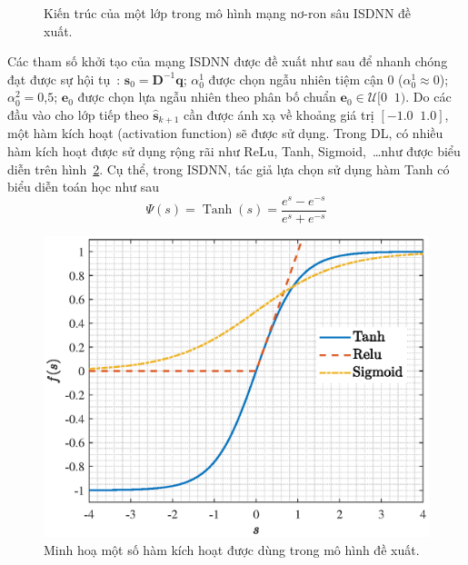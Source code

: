 \begin{figure}[ht]
    \caption{Kiến trúc của một lớp trong mô hình mạng nơ-ron sâu ISDNN đề xuất.}
    \label{fig:ISD}
\end{figure}

Các tham số khởi tạo của mạng ISDNN được đề xuất như sau để nhanh chóng đạt được sự hội tụ~\cite{Narasimhan2014}: $\mathbf{s}_0 = \mathbf{D}^{-1}\mathbf{q}$; $\alpha^1_0$ được chọn ngẫu nhiên tiệm cận $0$ ($\alpha^1_0 \approx 0$); $\alpha^2_0 = 0$,$5$; $\mathbf{e}_0$ được chọn lựa ngẫu nhiên theo phân bố chuẩn $\mathbf{e}_0 \in  \mathcal{U}[0 \;\; 1)$. Do các đầu vào cho lớp tiếp theo $\hat{\mathbf{s}}_{k+1}$ cần được ánh xạ về khoảng giá trị $[-1.0 \;\; 1.0]$, một hàm kích hoạt (activation function) sẽ được sử dụng. Trong DL, có nhiều hàm kích hoạt được sử dụng rộng rãi như ReLu, Tanh, Sigmoid,~\ldots như được biểu diễn trên hình~\ref{fig:tanh}. Cụ thể, trong ISDNN, tác giả lựa chọn sử dụng hàm Tanh có biểu diễn toán học như sau
\begin{equation}
    \Psi(s) = \operatorname{Tanh}(s) = \frac{e^s - e^{-s}}{e^s + e^{-s}}
\end{equation}
\begin{figure}[ht]
    \centering
    \includegraphics[width=.8\linewidth]{figures/tanh.eps}
    \caption{Minh hoạ một số hàm kích hoạt được dùng trong mô hình đề xuất.}
    \label{fig:tanh}
\end{figure}


